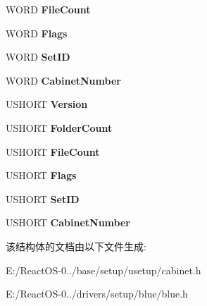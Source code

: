\begin{DoxyCompactItemize}
W\+O\+RD {\bfseries File\+Count}
\item 
\mbox{\label{struct___c_f_h_e_a_d_e_r_adb062eb1283947e9b457349b3566ef58}} 
W\+O\+RD {\bfseries Flags}
\item 
\mbox{\label{struct___c_f_h_e_a_d_e_r_a0e30fc8b0eae98cab44108311a9faa9d}} 
W\+O\+RD {\bfseries Set\+ID}
\item 
\mbox{\label{struct___c_f_h_e_a_d_e_r_adb19b6f5937d27329acd34da007729a4}} 
W\+O\+RD {\bfseries Cabinet\+Number}
\item 
\mbox{\label{struct___c_f_h_e_a_d_e_r_a057e7513af3c48923a79c3608357520a}} 
U\+S\+H\+O\+RT {\bfseries Version}
\item 
\mbox{\label{struct___c_f_h_e_a_d_e_r_ad4f5412ce405722eb80f696e9a959a60}} 
U\+S\+H\+O\+RT {\bfseries Folder\+Count}
\item 
\mbox{\label{struct___c_f_h_e_a_d_e_r_a8d41acc729c18e206b9fc5a6004f0d01}} 
U\+S\+H\+O\+RT {\bfseries File\+Count}
\item 
\mbox{\label{struct___c_f_h_e_a_d_e_r_adb062eb1283947e9b457349b3566ef58}} 
U\+S\+H\+O\+RT {\bfseries Flags}
\item 
\mbox{\label{struct___c_f_h_e_a_d_e_r_a0e30fc8b0eae98cab44108311a9faa9d}} 
U\+S\+H\+O\+RT {\bfseries Set\+ID}
\item 
\mbox{\label{struct___c_f_h_e_a_d_e_r_adb19b6f5937d27329acd34da007729a4}} 
U\+S\+H\+O\+RT {\bfseries Cabinet\+Number}
\end{DoxyCompactItemize}


该结构体的文档由以下文件生成\+:\begin{DoxyCompactItemize}
\item 
E\+:/\+React\+O\+S-\/0../base/setup/usetup/cabinet.\+h\item 
E\+:/\+React\+O\+S-\/0../drivers/setup/blue/blue.\+h\end{DoxyCompactItemize}
